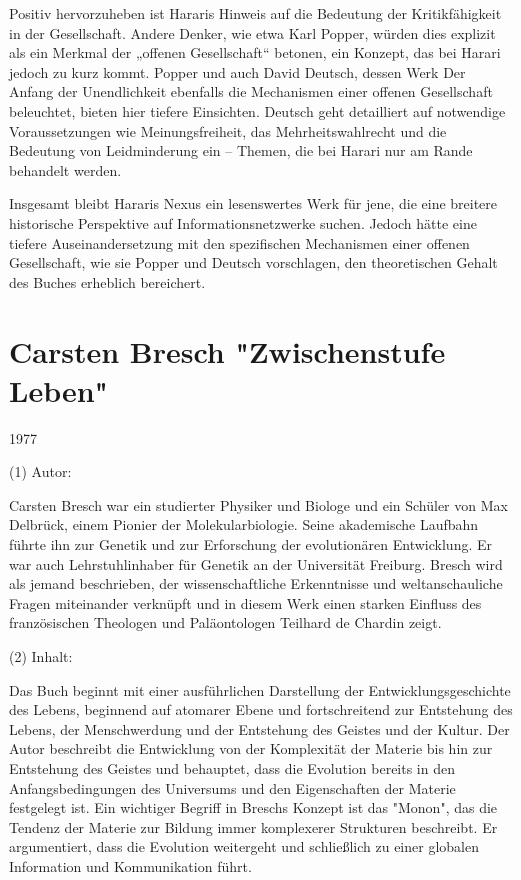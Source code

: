 \documentclass[
]{article}
\begin{document}
Positiv hervorzuheben ist Hararis Hinweis auf die Bedeutung der Kritikfähigkeit in der Gesellschaft. Andere Denker, wie etwa Karl Popper, würden dies explizit als ein Merkmal der „offenen Gesellschaft`` betonen, ein Konzept, das bei Harari jedoch zu kurz kommt. Popper und auch David Deutsch, dessen Werk Der Anfang der Unendlichkeit ebenfalls die Mechanismen einer offenen Gesellschaft beleuchtet, bieten hier tiefere Einsichten. Deutsch geht detailliert auf notwendige Voraussetzungen wie Meinungsfreiheit, das Mehrheitswahlrecht und die Bedeutung von Leidminderung ein -- Themen, die bei Harari nur am Rande behandelt werden.

Insgesamt bleibt Hararis Nexus ein lesenswertes Werk für jene, die eine breitere historische Perspektive auf Informationsnetzwerke suchen. Jedoch hätte eine tiefere Auseinandersetzung mit den spezifischen Mechanismen einer offenen Gesellschaft, wie sie Popper und Deutsch vorschlagen, den theoretischen Gehalt des Buches erheblich bereichert.

\section{\texorpdfstring{Carsten Bresch "Zwischenstufe Leben" }{Carsten Bresch "Zwischenstufe Leben" }}\label{carsten-bresch-zwischenstufe-leben}

1977

(1) Autor:

Carsten Bresch war ein studierter Physiker und Biologe und ein Schüler von Max Delbrück, einem Pionier der Molekularbiologie. Seine akademische Laufbahn führte ihn zur Genetik und zur Erforschung der evolutionären Entwicklung. Er war auch Lehrstuhlinhaber für Genetik an der Universität Freiburg. Bresch wird als jemand beschrieben, der wissenschaftliche Erkenntnisse und weltanschauliche Fragen miteinander verknüpft und in diesem Werk einen starken Einfluss des französischen Theologen und Paläontologen Teilhard de Chardin zeigt.

(2) Inhalt:

Das Buch beginnt mit einer ausführlichen Darstellung der Entwicklungsgeschichte des Lebens, beginnend auf atomarer Ebene und fortschreitend zur Entstehung des Lebens, der Menschwerdung und der Entstehung des Geistes und der Kultur. Der Autor beschreibt die Entwicklung von der Komplexität der Materie bis hin zur Entstehung des Geistes und behauptet, dass die Evolution bereits in den Anfangsbedingungen des Universums und den Eigenschaften der Materie festgelegt ist. Ein wichtiger Begriff in Breschs Konzept ist das "Monon", das die Tendenz der Materie zur Bildung immer komplexerer Strukturen beschreibt. Er argumentiert, dass die Evolution weitergeht und schließlich zu einer globalen Information und Kommunikation führt.
\end{document}
